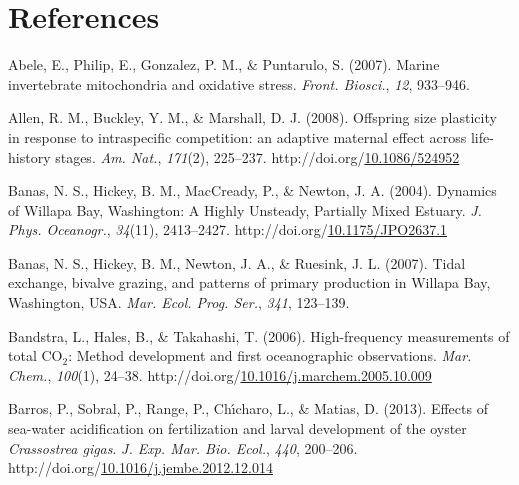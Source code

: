 \documentclass [11pt, proquest] {uwthesis}[2015/03/03]
\newlength{\cslhangindent}
\newenvironment{CSLReferences}%
{\setlength{\parindent}{0pt}%
\everypar{\setlength{\hangindent}{\cslhangindent}}\ignorespaces}%
{\par}
\begin{document}
\hypertarget{references}{%
\chapter*{References}\label{references}}


\noindent

\setlength{\parindent}{-0.20in}
\setlength{\leftskip}{0.20in}
\setlength{\parskip}{8pt}

\hypertarget{refs}{}
\begin{CSLReferences}{1}{0}
\leavevmode\hypertarget{ref-Abele2007}{}%
Abele, E., Philip, E., Gonzalez, P. M., \& Puntarulo, S. (2007). {Marine invertebrate mitochondria and oxidative stress}. \emph{Front. Biosci.}, \emph{12}, 933--946.

\leavevmode\hypertarget{ref-Allen2008}{}%
Allen, R. M., Buckley, Y. M., \& Marshall, D. J. (2008). {Offspring size plasticity in response to intraspecific competition: an adaptive maternal effect across life-history stages}. \emph{Am. Nat.}, \emph{171}(2), 225--237. http://doi.org/\href{https://doi.org/10.1086/524952}{10.1086/524952}

\leavevmode\hypertarget{ref-Banas2004}{}%
Banas, N. S., Hickey, B. M., MacCready, P., \& Newton, J. A. (2004). {Dynamics of Willapa Bay, Washington: A Highly Unsteady, Partially Mixed Estuary}. \emph{J. Phys. Oceanogr.}, \emph{34}(11), 2413--2427. http://doi.org/\href{https://doi.org/10.1175/JPO2637.1}{10.1175/JPO2637.1}

\leavevmode\hypertarget{ref-Banas2007}{}%
Banas, N. S., Hickey, B. M., Newton, J. A., \& Ruesink, J. L. (2007). {Tidal exchange, bivalve grazing, and patterns of primary production in Willapa Bay, Washington, USA}. \emph{Mar. Ecol. Prog. Ser.}, \emph{341}, 123--139.

\leavevmode\hypertarget{ref-Bandstra2006}{}%
Bandstra, L., Hales, B., \& Takahashi, T. (2006). {High-frequency measurements of total {CO\(_2\)}: Method development and first oceanographic observations}. \emph{Mar. Chem.}, \emph{100}(1), 24--38. http://doi.org/\href{https://doi.org/10.1016/j.marchem.2005.10.009}{10.1016/j.marchem.2005.10.009}

\leavevmode\hypertarget{ref-Barros2013}{}%
Barros, P., Sobral, P., Range, P., Chı́charo, L., \& Matias, D. (2013). {Effects of sea-water acidification on fertilization and larval development of the oyster \emph{Crassostrea gigas}}. \emph{J. Exp. Mar. Bio. Ecol.}, \emph{440}, 200--206. http://doi.org/\href{https://doi.org/10.1016/j.jembe.2012.12.014}{10.1016/j.jembe.2012.12.014}


\end{CSLReferences}
\end{document}
